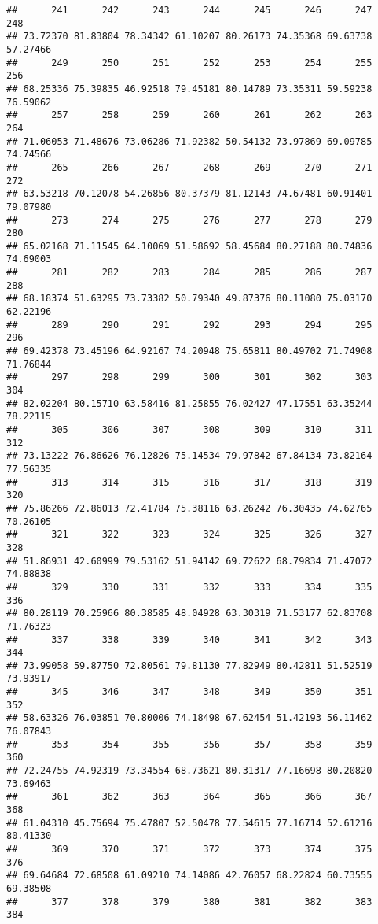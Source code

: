 \documentclass[
]{article}
\begin{document}
\begin{verbatim}
##      241      242      243      244      245      246      247      248 
## 73.72370 81.83804 78.34342 61.10207 80.26173 74.35368 69.63738 57.27466 
##      249      250      251      252      253      254      255      256 
## 68.25336 75.39835 46.92518 79.45181 80.14789 73.35311 59.59238 76.59062 
##      257      258      259      260      261      262      263      264 
## 71.06053 71.48676 73.06286 71.92382 50.54132 73.97869 69.09785 74.74566 
##      265      266      267      268      269      270      271      272 
## 63.53218 70.12078 54.26856 80.37379 81.12143 74.67481 60.91401 79.07980 
##      273      274      275      276      277      278      279      280 
## 65.02168 71.11545 64.10069 51.58692 58.45684 80.27188 80.74836 74.69003 
##      281      282      283      284      285      286      287      288 
## 68.18374 51.63295 73.73382 50.79340 49.87376 80.11080 75.03170 62.22196 
##      289      290      291      292      293      294      295      296 
## 69.42378 73.45196 64.92167 74.20948 75.65811 80.49702 71.74908 71.76844 
##      297      298      299      300      301      302      303      304 
## 82.02204 80.15710 63.58416 81.25855 76.02427 47.17551 63.35244 78.22115 
##      305      306      307      308      309      310      311      312 
## 73.13222 76.86626 76.12826 75.14534 79.97842 67.84134 73.82164 77.56335 
##      313      314      315      316      317      318      319      320 
## 75.86266 72.86013 72.41784 75.38116 63.26242 76.30435 74.62765 70.26105 
##      321      322      323      324      325      326      327      328 
## 51.86931 42.60999 79.53162 51.94142 69.72622 68.79834 71.47072 74.88838 
##      329      330      331      332      333      334      335      336 
## 80.28119 70.25966 80.38585 48.04928 63.30319 71.53177 62.83708 71.76323 
##      337      338      339      340      341      342      343      344 
## 73.99058 59.87750 72.80561 79.81130 77.82949 80.42811 51.52519 73.93917 
##      345      346      347      348      349      350      351      352 
## 58.63326 76.03851 70.80006 74.18498 67.62454 51.42193 56.11462 76.07843 
##      353      354      355      356      357      358      359      360 
## 72.24755 74.92319 73.34554 68.73621 80.31317 77.16698 80.20820 73.69463 
##      361      362      363      364      365      366      367      368 
## 61.04310 45.75694 75.47807 52.50478 77.54615 77.16714 52.61216 80.41330 
##      369      370      371      372      373      374      375      376 
## 69.64684 72.68508 61.09210 74.14086 42.76057 68.22824 60.73555 69.38508 
##      377      378      379      380      381      382      383      384 

\end{verbatim}
\end{document}
